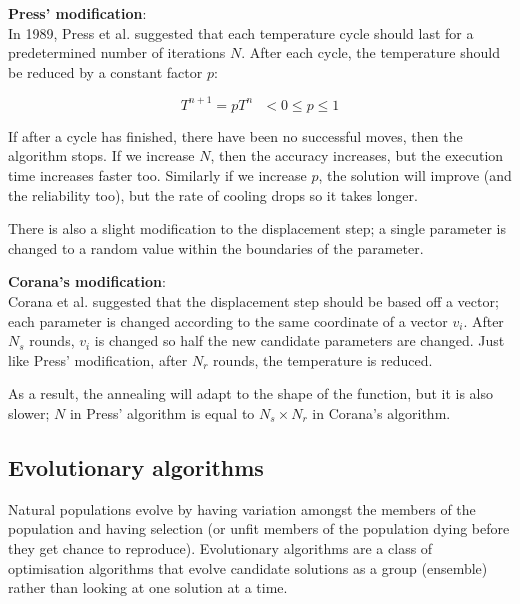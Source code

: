 \begin{description}
\begin{description}
    \item \textbf{Press' modification}:\\
      In 1989, Press et al. suggested that each temperature cycle should last
      for a predetermined number of iterations $N$. After each cycle, the
      temperature should be reduced by a constant factor $p$:

      \[
        T^{n+1} = pT^n~~~< 0\leq p \leq 1
      \]

      If after a cycle has finished, there have been no successful moves, then
      the algorithm stops. If we increase $N$, then the accuracy increases, but
      the execution time increases faster too. Similarly if we increase $p$, the
      solution will improve (and the reliability too), but the rate of cooling
      drops so it takes longer.

      There is also a slight modification to the displacement step; a single
      parameter is changed to a random value within the boundaries of the
      parameter.

    \item \textbf{Corana's modification}:\\
      Corana et al. suggested that the displacement step should be based off a
      vector; each parameter is changed according to the same coordinate of a
      vector $v_i$. After $N_s$ rounds, $v_i$ is changed so half the new
      candidate parameters are changed. Just like Press' modification, after
      $N_r$ rounds, the temperature is reduced.

      As a result, the annealing will adapt to the shape of the function, but
      it is also slower; $N$ in Press' algorithm is equal to $N_s \times N_r$ in
      Corana's algorithm.
  \end{description}

\end{description}


\subsection{Evolutionary algorithms}

Natural populations evolve by having variation amongst the members of the
population and having selection (or unfit members of the population dying before
they get chance to reproduce). Evolutionary algorithms are a class of
optimisation algorithms that evolve candidate solutions as a group (ensemble)
rather than looking at one solution at a time.

